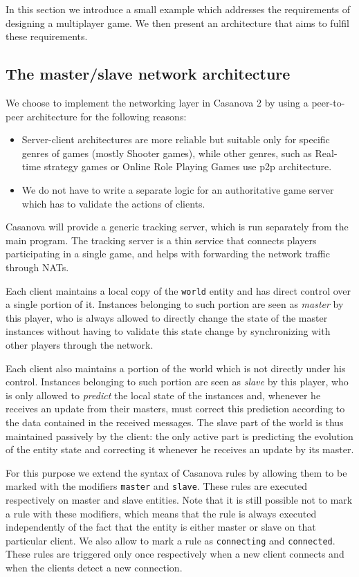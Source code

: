 In this section we introduce a small example which addresses the requirements of designing a multiplayer game. We then present an architecture that aims to fulfil these requirements.

\subsection*{The master/slave network architecture}

We choose to implement the networking layer in Casanova 2 by using a peer-to-peer architecture for the following reasons:

\begin{itemize}
	\item Server-client architectures are more reliable but suitable only for specific genres of games (mostly Shooter games), while other genres, such as Real-time strategy games or Online Role Playing Games use p2p architecture.
	\item We do not have to write a separate logic for an authoritative game server which has to validate the actions of clients.
\end{itemize}

Casanova will provide a generic tracking server, which is run separately from the main program. The tracking server is a thin service that connects players participating in a single game, and helps with forwarding the network traffic through NATs.

Each client maintains a local copy of the \texttt{world} entity and has direct control over a single portion of it. Instances belonging to such portion are seen as \textit{master} by this player, who is always allowed to directly change the state of the master instances without having to validate this state change by synchronizing with other players through the network.

Each client also maintains a portion of the world which is not directly under his control. Instances belonging to such portion are seen as \textit{slave} by this player, who is only allowed to \textit{predict} the local state of the instances and, whenever he receives an update from their masters, must correct this prediction according to the data contained in the received messages. The slave part of the world is thus maintained passively by the client: the only active part is predicting the evolution of the entity state and correcting it whenever he receives an update by its master.

For this purpose we extend the syntax of Casanova rules by allowing them to be marked with the modifiers \texttt{master} and \texttt{slave}. These rules are executed respectively on master and slave entities. Note that it is still possible not to mark a rule with these modifiers, which means that the rule is always executed independently of the fact that the entity is either master or slave on that particular client. We also allow to mark a rule as \texttt{connecting} and \texttt{connected}. These rules are triggered only once respectively when a new client connects and when the clients detect a new connection.

